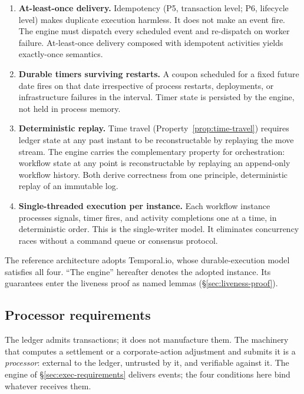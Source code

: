 \begin{enumerate}[nosep]
\item \textbf{At-least-once delivery.} Idempotency (P5, transaction level; P6, lifecycle level) makes duplicate execution harmless. It does not make an event fire. The engine must dispatch every scheduled event and re-dispatch on worker failure. At-least-once delivery composed with idempotent activities yields exactly-once semantics.

\item \textbf{Durable timers surviving restarts.} A coupon scheduled for a fixed future date fires on that date irrespective of process restarts, deployments, or infrastructure failures in the interval. Timer state is persisted by the engine, not held in process memory.

\item \textbf{Deterministic replay.} Time travel (Property~\ref{prop:time-travel}) requires ledger state at any past instant to be reconstructable by replaying the move stream. The engine carries the complementary property for orchestration: workflow state at any point is reconstructable by replaying an append-only workflow history. Both derive correctness from one principle, deterministic replay of an immutable log.

\item \textbf{Single-threaded execution per instance.} Each workflow instance processes signals, timer fires, and activity completions one at a time, in deterministic order. This is the single-writer model. It eliminates concurrency races without a command queue or consensus protocol.
\end{enumerate}

\noindent The reference architecture adopts Temporal.io, whose durable-execution model satisfies all four. ``The engine'' hereafter denotes the adopted instance. Its guarantees enter the liveness proof as named lemmas (\S\ref{sec:liveness-proof}).

\subsection{Processor requirements}
\label{sec:processor-contract}

The ledger admits transactions; it does not manufacture them. The machinery that computes a settlement or a corporate-action adjustment and submits it is a \emph{processor}: external to the ledger, untrusted by it, and verifiable against it. The engine of \S\ref{sec:exec-requirements} delivers events; the four conditions here bind whatever receives them.

